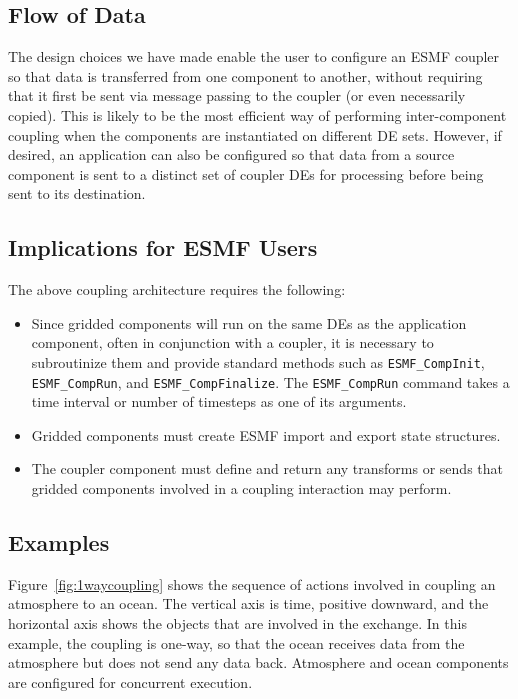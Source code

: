 \subsection{Flow of Data}

The design choices we have made enable the user to configure an ESMF
coupler so that data is transferred from one component to another, 
without requiring that it first be sent via message passing to the
coupler (or even necessarily
copied).  This is likely to be the most efficient way of performing 
inter-component coupling when the components are instantiated on different
DE sets.  However, if desired, an application can also be configured so that
data from a source component is sent to a distinct set of coupler 
DEs for processing before being sent to its destination.

\subsection{Implications for ESMF Users}

The above coupling architecture requires the following:
\begin{itemize}
\item Since gridded components will run on the same 
DEs as the application component, often in conjunction with a coupler, 
it is necessary to subroutinize
them and provide standard methods such as {\tt ESMF\_CompInit}, 
{\tt ESMF\_CompRun}, and {\tt ESMF\_CompFinalize}.  The {\tt ESMF\_CompRun}
command takes a time interval or number of timesteps as one of its 
arguments.
\item Gridded components must create ESMF import and export state 
structures.
\item The coupler component must define and return any transforms or 
sends that gridded components involved in a coupling interaction may 
perform.
\end{itemize}

\subsection{Examples}

Figure~\ref{fig:1waycoupling} shows the sequence of actions involved
in coupling an atmosphere to an ocean.  The vertical axis is time, positive
downward, and the horizontal axis shows the objects that are involved in the
exchange.  In this example, the coupling is one-way, so that the ocean 
receives data from the atmosphere but does not send any data back.  Atmosphere
and ocean components are configured for concurrent execution.

